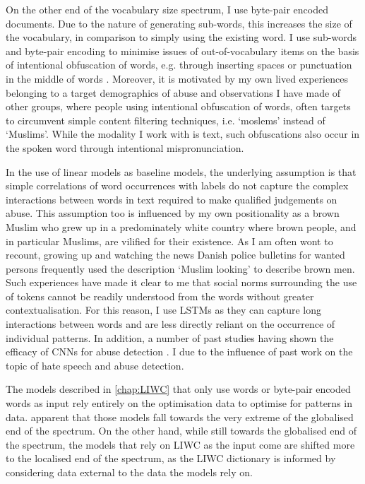{On the other end of the vocabulary size spectrum, I use byte-pair encoded documents.
Due to the nature of generating sub-words, this increases the size of the vocabulary, in comparison to simply using the existing word.
I use sub-words and byte-pair encoding to minimise issues of out-of-vocabulary items on the basis of intentional obfuscation of words, e.g. through inserting spaces or punctuation in the middle of words \citep{Rottger:2021}.
Moreover, it is motivated by my own lived experiences belonging to a target demographics of abuse and observations I have made of other groups, where people using intentional obfuscation of words, often targets to circumvent simple content filtering techniques, i.e. `moslems' instead of `Muslims'.
While the modality I work with is text, such obfuscations also occur in the spoken word through intentional mispronunciation.

In the use of linear models as baseline models, the underlying assumption  is that simple correlations of word occurrences with labels do not capture the complex interactions between words in text required to make qualified judgements on abuse.
This assumption too is influenced by my own positionality as a brown Muslim who grew up in a predominately white country where brown people, and in particular Muslims, are vilified for their existence.
As I am often wont to recount, growing up and watching the news Danish police bulletins for wanted persons frequently used the description `Muslim looking' to describe brown men.
Such experiences have made it clear to me that social norms surrounding the use of tokens cannot be readily understood from the words  without greater contextualisation.
For this reason, I use LSTMs as they can capture long interactions between words and are less directly reliant on the occurrence of individual patterns.
In addition, a number of past studies having shown the efficacy of CNNs for abuse detection \citep{Park:2017, Mitchell:2019,Kolhatkar:2020,Rizwan:2020,Safaya:2020,Gamback:2017}.
I   due to the influence of past work on the topic of hate speech and abuse detection.

The models described in \autoref{chap:LIWC} that only use words or byte-pair encoded words as input rely entirely on the optimisation data to optimise for patterns in data.
 apparent that those models fall towards the very extreme of the globalised end of the  spectrum.
On the other hand, while still towards the globalised end of the spectrum, the models that rely on LIWC as the input come are shifted more to the localised end of the spectrum, as the LIWC dictionary  is informed by considering data external to the data the models rely on.

}
